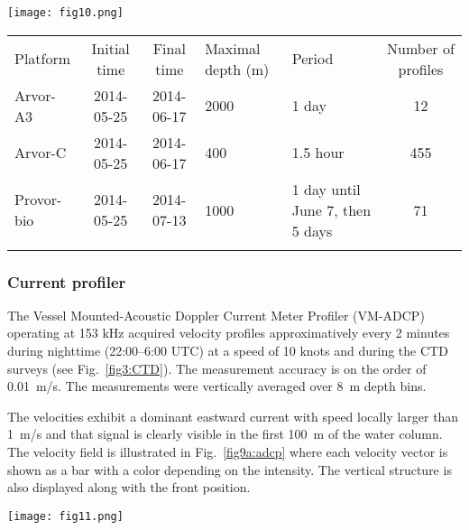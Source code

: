 \documentclass[essd]{copernicus}
\begin{document}
\begin{figure*}[h]
\texttt{[image: fig10.png]}
\caption{Profiling floats trajectories (top-left panel) and salinity from May 25 to June 15, 2014. \label{fig8:argofloats}}
\end{figure*}


\begin{table*}[htpb]
\caption{Characteristics of the profiling floats.\label{tab:argofloats}}
\begin{tabular}{lccllc}
\tophline
Platform 			& Initial time	& Final time	& Maximal depth (m)		& Period & Number of profiles \\
\middlehline
Arvor-A3			& 2014-05-25	& 2014-06-17	& 2000		& 1 day 	& 12 							\\ 
Arvor-C				& 2014-05-25	& 2014-06-17	& 400		& 1.5 hour	& 455				\\ 
Provor-bio			& 2014-05-25	& 2014-07-13	& 1000		& 1 day until June 7, then 5 days	& 71	\\ 
\bottomhline
\end{tabular}
\end{table*}

\subsubsection{Current profiler\label{sec:adcp}}

The Vessel Mounted-Acoustic Doppler Current Meter Profiler (VM-ADCP) operating at 153 kHz acquired velocity profiles approximatively every 2 minutes during nighttime (22:00--6:00 UTC) at a speed of 10 knots and during the CTD surveys (see Fig.~\ref{fig3:CTD}). The measurement accuracy is on the order of 0.01~m/s. The measurements were vertically averaged over 8~m depth bins.

The velocities exhibit a dominant eastward current with speed locally larger than 1~m/s and that signal is clearly visible in the first 100~m of the water column. The velocity field is illustrated in Fig.~\ref{fig9a:adcp} where each velocity vector is shown as a bar with a color depending on the intensity. The vertical structure is also displayed along with the front position.

\begin{figure*}[h]
\texttt{[image: fig11.png]}
\caption{Velocity field obtained with the ADCP at a 40~m depth (left panel) and sections of zonal velocity on May 26 (S1) and 27 (S2). The locations of the sections are indicated by dashed rectangles on the map. Only data with a quality flag equal to 1 (good data) are represented\label{fig9a:adcp}}
\end{figure*}
\end{document}
